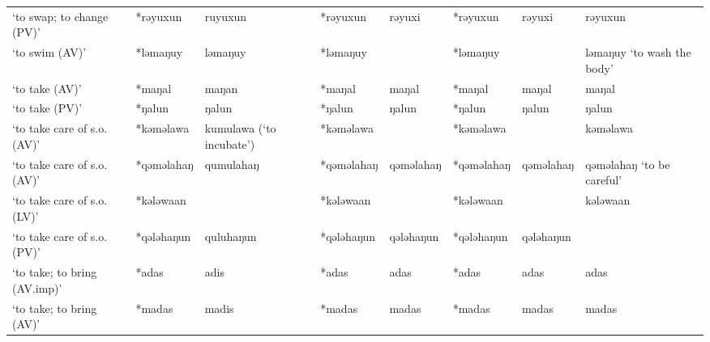 \begin{landscape}
\begin{longtable}[c]{@{}p{3cm}<{\raggedright}p{2.75cm}<{\raggedright}p{2.75cm}<{\raggedright}p{2.75cm}<{\raggedright}p{2.75cm}<{\raggedright}p{2.75cm}<{\raggedright}p{2.75cm}<{\raggedright}p{2.75cm}<{\raggedright}@{}}
`to swap; to change (PV)'                            & *rəyuxun     & ruyuxun                       & *rəyuxun       & rəyuxi                     & *rəyuxun         & rəyuxi                   & rəyuxun                           \\
`to swim (AV)'                                       & *ləmaŋuy     & ləmaŋuy                       & *ləmaŋuy       &                            & *ləmaŋuy         &                          & ləmaŋuy `to wash the body'        \\
`to take (AV)'                                       & *maŋal       & maŋan                         & *maŋal         & maŋal                      & *maŋal           & maŋal                    & maŋal                             \\
`to take (PV)'                                       & *ŋalun       & ŋalun                         & *ŋalun         & ŋalun                      & *ŋalun           & ŋalun                    & ŋalun                             \\
`to take care of s.o. (AV)'                          & *kəməlawa    & kumulawa (`to incubate')      & *kəməlawa      &                            & *kəməlawa        &                          & kəməlawa                          \\
`to take care of s.o. (AV)'                          & *qəməlahaŋ   & qumulahaŋ                     & *qəməlahaŋ     & qəməlahaŋ                  & *qəməlahaŋ       & qəməlahaŋ                & qəməlahaŋ `to be careful'         \\
`to take care of s.o. (LV)'                          & *kələwaan    &                               & *kələwaan      &                            & *kələwaan        &                          & kələwaan                          \\
`to take care of s.o. (PV)'                          & *qələhaŋun   & quluhaŋun                     & *qələhaŋun     & qələhaŋun                  & *qələhaŋun       & qələhaŋun                &                                   \\
`to take; to bring (AV.imp)'                         & *adas        & adis                          & *adas          & adas                       & *adas            & adas                     & adas                              \\
`to take; to bring (AV)'                             & *madas       & madis                         & *madas         & madas                      & *madas           & madas                    & madas                             \\

\end{longtable}
\end{landscape}
